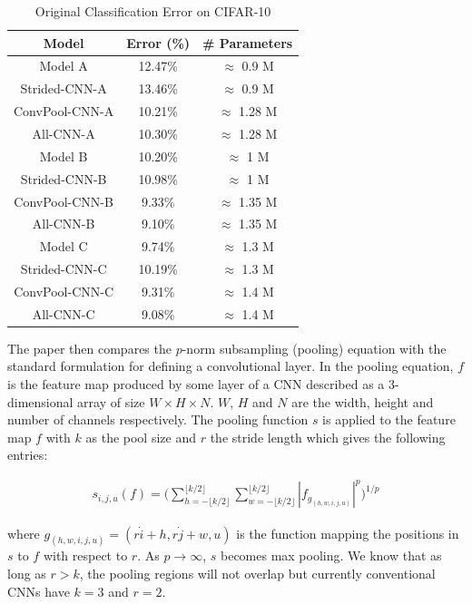 \begin{table}
  \centering
  \begin{tabular}{|c c c|}
    \hline
    Model & Error (\%) & \# Parameters \\
    \hline
    Model A & 12.47\% & $\approx$ 0.9 M \\
    Strided-CNN-A & 13.46\% & $\approx$ 0.9 M \\
    ConvPool-CNN-A & 10.21\% & $\approx$ 1.28 M \\
    All-CNN-A & 10.30\% & $\approx$ 1.28 M \\
    \hline
    Model B & 10.20\% & $\approx$ 1 M \\
    Strided-CNN-B & 10.98\% & $\approx$ 1 M \\
    ConvPool-CNN-B & 9.33\% & $\approx$ 1.35 M \\
    All-CNN-B & 9.10\% & $\approx$ 1.35 M \\
    \hline
    Model C & 9.74\% & $\approx$ 1.3 M \\
    Strided-CNN-C & 10.19\% & $\approx$ 1.3 M \\
    ConvPool-CNN-C & 9.31\% & $\approx$ 1.4 M \\
    All-CNN-C & 9.08\% & $\approx$ 1.4 M \\
    \hline
  \end{tabular}
  \caption{Original Classification Error on CIFAR-10}
  \label{SFA}
\end{table}

The paper then compares the $p$-norm subsampling (pooling) equation with the standard formulation for defining a convolutional layer. In the pooling equation, $f$ is the feature map produced by some layer of a CNN described as a 3-dimensional array of size $W \times H \times N$. $W$, $H$ and $N$ are the width, height and number of channels respectively. The pooling function $s$ is applied to the feature map $f$ with $k$ as the pool size and $r$ the stride length which gives the following entries: 

\begin{align}
s_{i,j,u}(f) = \bigg ( \sum_{h = - \lfloor k/2 \rfloor}^{\lfloor k/2 \rfloor} \sum_{w = - \lfloor k/2 \rfloor}^{\lfloor k/2 \rfloor} |f_{g_{(h,w,i,j,u)}}|^{p} \bigg ) ^{1/p} 
\end{align}

\noindent where $g_{(h,w,i,j,u)} = (r \dot i + h, r \dot j + w, u)$ is the function mapping the positions in $s$ to $f$ with respect to $r$. As $p \rightarrow \infty$, $s$ becomes max pooling. We know that as long as $r > k$, the pooling regions will not overlap but currently conventional CNNs have $k = 3$ and $r = 2$. 

